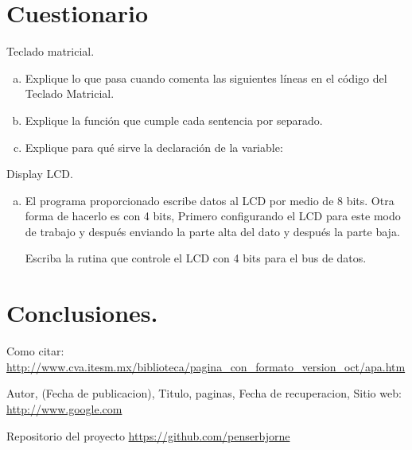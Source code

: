 \documentclass[a4paper,11pt]{article}                 %
\begin{document}
 
  \section{Cuestionario}
  
  Teclado matricial. 
  
  \begin{enumerate}[a)]

  	\item  Explique lo que pasa cuando comenta las siguientes líneas en el código del Teclado Matricial.    
  	
    \item  Explique la función que cumple cada sentencia por separado. 
    
    \item  Explique para qué sirve la declaración de la variable: 
  	  
  \end{enumerate}

Display LCD. 

  \begin{enumerate}[a)]
	\item El programa proporcionado escribe datos al LCD por medio de 8 bits. Otra forma de hacerlo es con 4 bits, Primero configurando el LCD para este modo de trabajo y después enviando la parte alta del dato y después la parte baja.
	 
	   Escriba la rutina que controle el LCD con 4 bits para el bus de datos. 
	
\end{enumerate}



\section{Conclusiones.}
  \begin{thebibliography}{}                           %
      Como citar: \url{http://www.cva.itesm.mx/biblioteca/pagina_con_formato_version_oct/apa.htm} %

      Autor,
      (Fecha de publicacion),
      Titulo, paginas,
      Fecha de recuperacion,
      Sitio web: \url{http://www.google.com}

      Repositorio del proyecto \url{https://github.com/penserbjorne}
  \end{thebibliography}

\end{document}
